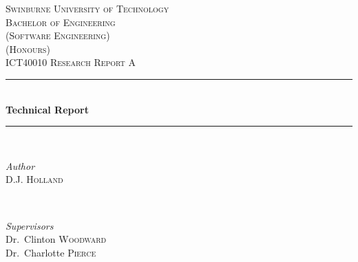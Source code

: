 \begin{titlepage} %
  \newcommand{\HRule}{\rule{\linewidth}{0.5mm}} %

  \center{} %


  \textsc{\LARGE Swinburne University of Technology}\\[1.5cm]

  \textsc{
    \Large
    Bachelor of Engineering\\
    (Software Engineering)\\
    (Honours)
  }\\[0.5cm]

  \textsc{\large ICT40010 Research Report A}\\[0.5cm]


  \HRule{}\\[0.4cm]

  {\huge\bfseries Technical Report}\\[0.2cm]

  \HRule{}\\[1.5cm]


  \begin{minipage}{0.4\textwidth}
    \begin{flushleft}
      \large
      \textit{Author}\\
      D.J. \textsc{Holland}
    \end{flushleft}
  \end{minipage}
  {~}
  \begin{minipage}{0.4\textwidth}
    \begin{flushright}
      \large
      \textit{Supervisors}\\
      Dr.\ Clinton \textsc{Woodward}\\
      Dr.\ Charlotte \textsc{Pierce}
    \end{flushright}
  \end{minipage}


\end{titlepage}
